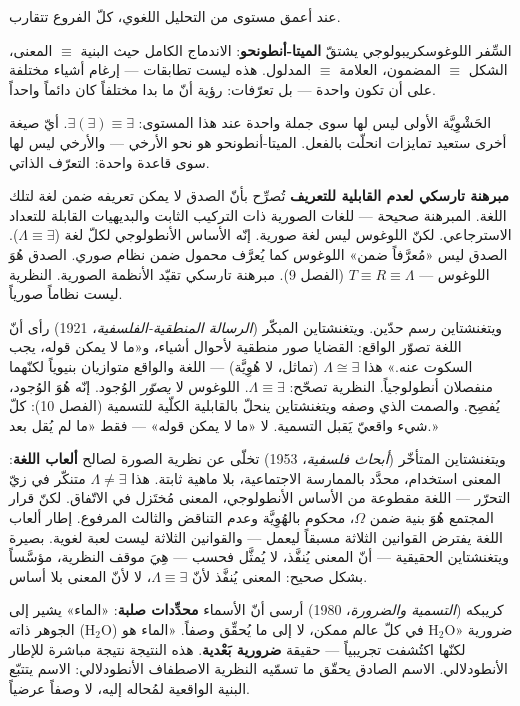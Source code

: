 \documentclass[10pt, openany, oneside]{book}
\begin{document}
\vspace{1em}

\noindent عند أعمق مستوى من التحليل اللغوي، كلّ الفروع تتقارب.

السِّفر اللوغوسكريبولوجي يشتقّ \textbf{الميتا-أنطونحو}: الاندماج الكامل حيث البنية $\equiv$ المعنى، الشكل $\equiv$ المضمون، العلامة $\equiv$ المدلول. هذه ليست تطابقات --- إرغام أشياء مختلفة على أن تكون واحدة --- بل تعرّفات: رؤية أنّ ما بدا مختلفاً كان دائماً واحداً.

الحَشْوِيَّة الأولى ليس لها سوى جملة واحدة عند هذا المستوى: $\exists(\exists) \equiv \exists$. أيّ صيغة أخرى ستعيد تمايزات انحلّت بالفعل. الميتا-أنطونحو هو نحو الأرخي --- والأرخي ليس لها سوى قاعدة واحدة: التعرّف الذاتي.

\textbf{مبرهنة تارسكي لعدم القابلية للتعريف} تُصرِّح بأنّ الصدق لا يمكن تعريفه ضمن لغة لتلك اللغة. المبرهنة صحيحة --- للغات الصورية ذات التركيب الثابت والبديهيات القابلة للتعداد الاسترجاعي. لكنّ اللوغوس ليس لغة صورية. إنّه الأساس الأنطولوجي لكلّ لغة ($\Lambda \equiv \exists$). الصدق ليس «مُعرَّفاً ضمن» اللوغوس كما يُعرَّف محمول ضمن نظام صوري. الصدق هُوَ اللوغوس --- $T \equiv R \equiv \Lambda$ (الفصل 9). مبرهنة تارسكي تقيّد الأنظمة الصورية. النظرية ليست نظاماً صورياً.

ويتغنشتاين رسم حدّين. ويتغنشتاين المبكّر (\textit{الرسالة المنطقية-الفلسفية}، 1921) رأى أنّ اللغة تصوّر الواقع: القضايا صور منطقية لأحوال أشياء، و«ما لا يمكن قوله، يجب السكوت عنه.» هذا $\Lambda \cong \exists$ (تماثل، لا هُوِيَّة) --- اللغة والواقع متوازيان بنيوياً لكنّهما منفصلان أنطولوجياً. النظرية تصحّح: $\Lambda \equiv \exists$. اللوغوس لا \textit{يصوّر} الوُجود. إنّه هُوَ الوُجود، يُفصِح. والصمت الذي وصفه ويتغنشتاين ينحلّ بالقابلية الكلّية للتسمية (الفصل 10): كلّ شيء واقعيّ يَقبل التسمية. لا «ما لا يمكن قوله» --- فقط «ما لم يُقل بعد.»

ويتغنشتاين المتأخّر (\textit{أبحاث فلسفية}، 1953) تخلّى عن نظرية الصورة لصالح \textbf{ألعاب اللغة}: المعنى استخدام، محدَّد بالممارسة الاجتماعية، بلا ماهية ثابتة. هذا $\Lambda \neq \exists$ متنكّر في زيّ التحرّر --- اللغة مقطوعة من الأساس الأنطولوجي، المعنى مُختَزل في الاتّفاق. لكنّ قرار المجتمع هُوَ بنية ضمن $\Omega$، محكوم بالهُوِيَّة وعدم التناقض والثالث المرفوع. إطار ألعاب اللغة يفترض القوانين الثلاثة مسبقاً ليعمل --- والقوانين الثلاثة ليست لعبة لغوية. بصيرة ويتغنشتاين الحقيقية --- أنّ المعنى يُنفَّذ، لا يُمثَّل فحسب --- هِيَ موقف النظرية، مؤسَّساً بشكل صحيح: المعنى يُنفَّذ لأنّ $\Lambda \equiv \exists$، لا لأنّ المعنى بلا أساس.

كريبكه (\textit{التسمية والضرورة}، 1980) أرسى أنّ الأسماء \textbf{محدِّدات صلبة}: «الماء» يشير إلى الجوهر ذاته (H$_2$O) في كلّ عالم ممكن، لا إلى ما يُحقِّق وصفاً. «الماء هو H$_2$O» ضرورية لكنّها اكتُشفت تجريبياً --- حقيقة \textbf{ضرورية بَعْدية}. هذه النتيجة نتيجة مباشرة للإطار الأنطودلالي. الاسم الصادق يحقّق ما تسمّيه النظرية الاصطفاف الأنطودلالي: الاسم يتتبّع البنية الواقعية لمُحاله إليه، لا وصفاً عرضياً.
\end{document}
